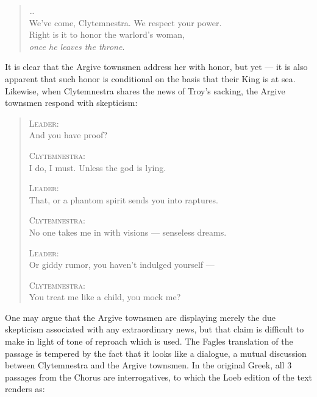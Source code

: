 \begin{quote}
    \ldots\ \\
    We've come, Clytemnestra. We respect your power. \\
    Right is it to honor the warlord's woman, \\
    \textit{once he leaves the throne}. \\
    \autocite[258]{fagles}
\end{quote}

\noindent
It is clear that the Argive townsmen address her with honor, but yet --- it is
also apparent that such honor is conditional on the basis that their King is
at sea. Likewise, when Clytemnestra shares the news of Troy's sacking, the
Argive townsmen respond with skepticism:

\begin{quote}
  \textsc{Leader}: \\
  And you have proof?

  \textsc{Clytemnestra}: \\
  I do, I must. Unless the god is lying.

  \textsc{Leader}: \\
  That, or a phantom spirit sends you into raptures.

  \textsc{Clytemnestra}: \\
  No one takes me in with visions --- senseless dreams.

  \textsc{Leader}: \\
  Or giddy rumor, you haven't indulged yourself ---

  \textsc{Clytemnestra}: \\
  You treat me like a child, you mock me?

  \autocite[275]{fagles}
\end{quote}

\noindent
One may argue that the Argive townsmen are displaying merely the due skepticism
associated with any extraordinary news, but that claim is difficult to make in
light of tone of reproach which is used. The Fagles translation of the passage
is tempered by the fact that it looks like a dialogue, a mutual discussion
between Clytemnestra and the Argive townsmen. In the original Greek, all 3
passages from the Chorus are interrogatives, to which the Loeb edition of the
text renders as:

